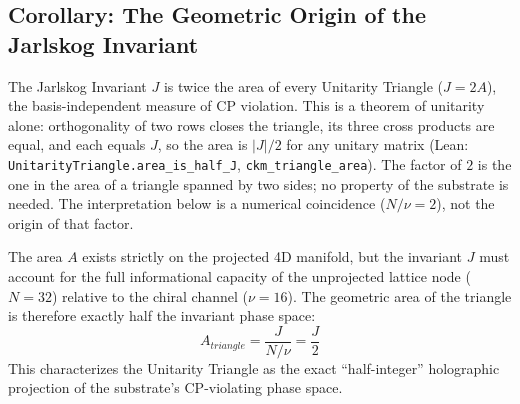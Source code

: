 \subsection{Corollary: The Geometric Origin of the Jarlskog Invariant}

The Jarlskog Invariant $J$ is twice the area of every Unitarity Triangle ($J = 2A$), the basis-independent measure of CP violation. This is a theorem of unitarity alone: orthogonality of two rows closes the triangle, its three cross products are equal, and each equals $J$, so the area is $|J|/2$ for any unitary matrix (Lean: \texttt{UnitarityTriangle.area\_is\_half\_J}, \texttt{ckm\_triangle\_area}). The factor of $2$ is the one in the area of a triangle spanned by two sides; no property of the substrate is needed. The interpretation below is a numerical coincidence ($N/\nu=2$), not the origin of that factor. 

The area $A$ exists strictly on the projected 4D manifold, but the invariant $J$ must account for the full informational capacity of the unprojected lattice node ($N=32$) relative to the chiral channel ($\nu=16$). The geometric area of the triangle is therefore exactly half the invariant phase space:
\begin{equation}
    A_{triangle} = \frac{J}{N/\nu} = \frac{J}{2}
\end{equation}
This characterizes the Unitarity Triangle as the exact ``half-integer'' holographic projection of the substrate's CP-violating phase space.